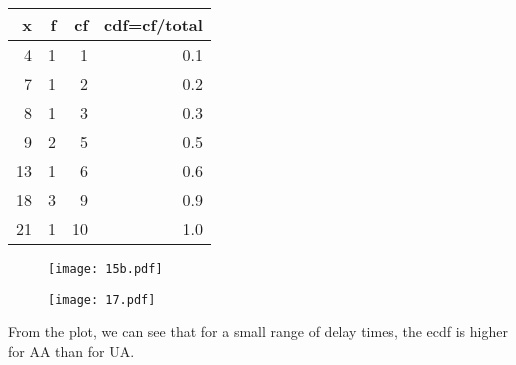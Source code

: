 \documentclass[twocolumn]{article}
\begin{document}
\begin{table}[h]
\centering
\begin{tabular}{@{}rrrr@{}}
\toprule
x  & f & cf & cdf=cf/total \\ \midrule
4  & 1 & 1  & 0.1          \\
7  & 1 & 2  & 0.2          \\
8  & 1 & 3  & 0.3          \\
9  & 2 & 5  & 0.5          \\
13 & 1 & 6  & 0.6          \\
18 & 3 & 9  & 0.9          \\
21 & 1 & 10 & 1.0          \\ \bottomrule
\end{tabular}
\end{table}
\begin{figure}[!ht]
\centering
\texttt{[image: 15b.pdf]}
\end{figure}

\newpage

\begin{figure}[!ht]
\centering
\texttt{[image: 17.pdf]}
\end{figure}

From the plot, we can see that for a small range of delay times, the ecdf is higher for AA than for UA.
\end{document}
